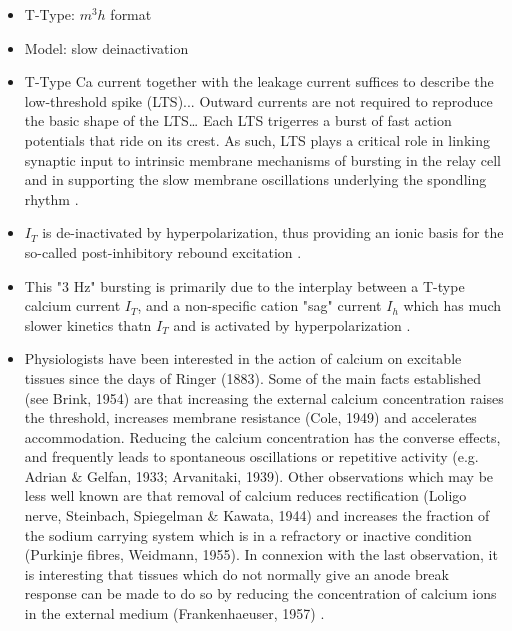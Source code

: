 \documentclass[./workflow.tex]{subfiles}
\begin{document}
\begin{itemize}
        \item T-Type: $m^3h$ format \cite{wangModelTtypeCalcium1991}
        
        \item Model: slow deinactivation \cite{wangModelTtypeCalcium1991}
        
        \item T-Type Ca current together with the leakage current suffices to describe the low-threshold
        spike (LTS)... Outward currents are not required to reproduce the basic shape of the LTS\dots
        Each LTS trigerres a burst of fast action potentials that ride on its crest. As such,
        LTS plays a critical role in linking synaptic input to intrinsic membrane mechanisms of bursting in
        the relay cell and in supporting the slow membrane oscillations underlying the spondling rhythm
        \cite{wangModelTtypeCalcium1991}.

        \item $I_T$ is de-inactivated by hyperpolarization, thus providing an ionic basis for the so-called
        post-inhibitory rebound excitation \cite{wangMultipleDynamicalModes1994}.

        \item This "3 Hz" bursting is primarily due to the interplay between a T-type calcium current
        $I_T$, and a non-specific cation "sag" current $I_h$ which has much slower kinetics thatn $I_T$
        and is activated by hyperpolarization \cite{wangMultipleDynamicalModes1994}.
        
        \item Physiologists have been interested in the action of calcium on excitable tissues since
        the days of Ringer (1883). Some of the main facts established (see Brink, 1954) are that
        increasing the external calcium concentration raises the threshold, increases membrane
        resistance (Cole, 1949) and accelerates accommodation. Reducing the calcium concentration
        has the converse effects, and frequently leads to spontaneous oscillations or
        repetitive activity (e.g. Adrian \& Gelfan, 1933; Arvanitaki, 1939). Other observations
        which may be less well known are that removal of calcium reduces rectification
        (Loligo nerve, Steinbach, Spiegelman \& Kawata, 1944) and increases the fraction of the
        sodium carrying system which is in a refractory or inactive condition
        (Purkinje fibres, Weidmann, 1955). In connexion with the last observation, it is interesting
        that tissues which do not normally give an anode break response can be made to do so by
        reducing the concentration of calcium ions in the external medium
        (Frankenhaeuser, 1957) \cite{frankenhaeuserActionCalciumElectrical1957}.
    \end{itemize}
\end{document}
